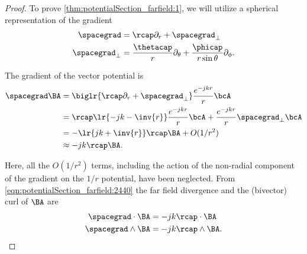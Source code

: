 %
%

\begin{proof}
To prove \cref{thm:potentialSection_farfield:1}, we will utilize a
spherical representation of the gradient
\begin{equation}\label{eqn:potentialSection_farfield:2420}
\begin{aligned}
\spacegrad &= \rcap \partial_r + \spacegrad_\perp \\
\spacegrad_\perp &= \frac{\thetacap}{r} \partial_\theta + \frac{\phicap}{r\sin\theta} \partial_\phi.
\end{aligned}
\end{equation}

The gradient of the vector potential is
\begin{equation}\label{eqn:potentialSection_farfield:2440}
\begin{aligned}
\spacegrad \BA
&= \biglr{ \rcap \partial_r + \spacegrad_\perp } \frac{e^{-j k r}}{r} \bcA \\
&= \rcap \lr{ -j k - \inv{r} } \frac{e^{-j k r}}{r} \bcA
   +
   \frac{e^{-j k r}}{r} \spacegrad_\perp \bcA \\
&= - \lr{ j k + \inv{r} } \rcap \BA + O(1/r^2) \\
&\approx - j k \rcap \BA.
\end{aligned}
\end{equation}

Here, all the \( O(1/r^2) \) terms, including the action of the non-radial component of the gradient on the \( 1/r \) potential, have been neglected.
From \cref{eqn:potentialSection_farfield:2440} the far field divergence and the (bivector) curl of \( \BA \) are
\begin{equation}\label{eqn:potentialSection_farfield:2460}
\begin{aligned}
\spacegrad \cdot \BA &= - j k \rcap \cdot \BA \\
\spacegrad \wedge \BA &= - j k \rcap \wedge \BA.
\end{aligned}
\end{equation}


\end{proof}
